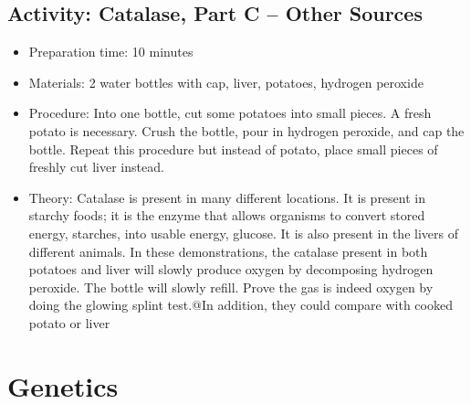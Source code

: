 \subsection{Activity: Catalase, Part C – Other Sources}
\begin{itemize}
\item{Preparation time: 10 minutes}
\item{Materials: 2 water bottles with cap, liver, potatoes, hydrogen peroxide}
\item{Procedure: Into one bottle, cut some potatoes into small pieces. A fresh potato is necessary. Crush the bottle, pour in hydrogen peroxide, and cap the bottle. Repeat this procedure but instead of potato, place small pieces of freshly cut liver instead. }
\item{Theory: Catalase is present in many different locations. It is present in starchy foods; it is the enzyme that allows organisms to convert stored energy, starches, into usable energy, glucose. It is also present in the livers of different animals. In these demonstrations, the catalase present in both potatoes and liver will slowly produce oxygen by decomposing hydrogen peroxide. The bottle will slowly refill. Prove the gas is indeed oxygen by doing the glowing splint test.@In addition, they could compare with cooked potato or liver}
\end{itemize}

\section{Genetics}

